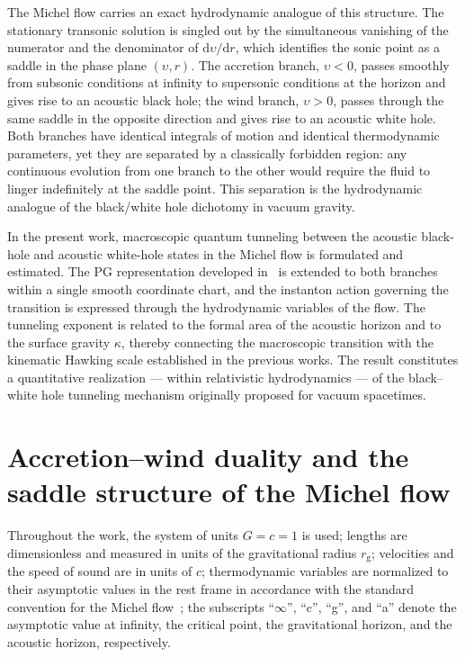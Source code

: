 \documentclass[12pt,a4paper,preprint]{elsarticle}
\begin{document}
        The Michel flow carries an exact hydrodynamic analogue of this structure. The stationary transonic solution is singled out by the simultaneous vanishing of the numerator and the denominator of $\mathrm{d}\upsilon/\mathrm{d}r$, which identifies the sonic point as a saddle in the phase plane $(\upsilon, r)$. The accretion branch, $\upsilon < 0$, passes smoothly from subsonic conditions at infinity to supersonic conditions at the horizon and gives rise to an acoustic black hole; the wind branch, $\upsilon > 0$, passes through the same saddle in the opposite direction and gives rise to an acoustic white hole. Both branches have identical integrals of motion and identical thermodynamic parameters, yet they are separated by a classically forbidden region: any continuous evolution from one branch to the other would require the fluid to linger indefinitely at the saddle point. This separation is the hydrodynamic analogue of the black/white hole dichotomy in vacuum gravity.
        
        In the present work, macroscopic quantum tunneling between the acoustic black-hole and acoustic white-hole states in the Michel flow is formulated and estimated. The PG representation developed in~\cite{SemyannikovAV_GlobalAcousticGeometryOfMichelFlowInPainleveGullstrandCoordinates_2026} is extended to both branches within a single smooth coordinate chart, and the instanton action governing the transition is expressed through the hydrodynamic variables of the flow. The tunneling exponent is related to the formal area of the acoustic horizon and to the surface gravity $\kappa$, thereby connecting the macroscopic transition with the kinematic Hawking scale established in the previous works. The result constitutes a quantitative realization --- within relativistic hydrodynamics --- of the black--white hole tunneling mechanism originally proposed for vacuum spacetimes.

    \section{Accretion--wind duality and the saddle structure of the Michel flow}\label{sec:duality}
        Throughout the work, the system of units $G = c = 1$ is used; lengths are dimensionless and measured in units of the gravitational radius $r_{\mathrm{g}}$; velocities and the speed of sound are in units of $c$; thermodynamic variables are normalized to their asymptotic values in the rest frame in accordance with the standard convention for the Michel flow~\cite{MichelFC_AccretionOfMatterByCondensedObjects_1972, MoncriefV_StabilityOfStationarySphericalAccretionOntoASchwarzschildBlackHole_1980}; the subscripts ``$\infty$'', ``c'', ``g'', and ``a'' denote the asymptotic value at infinity, the critical point, the gravitational horizon, and the acoustic horizon, respectively.
\end{document}
